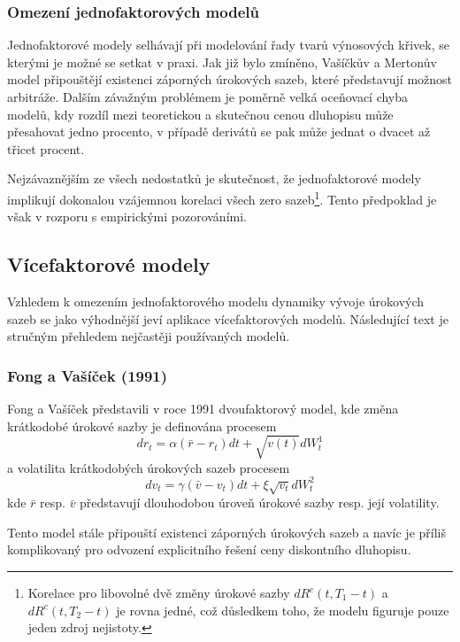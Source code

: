 \documentclass[a4paper]{book}
\begin{document}
\subsubsection{Omezení jednofaktorových modelů}

Jednofaktorové modely selhávají při modelování řady tvarů výnosových křivek, se kterými je možné se setkat v praxi. Jak již bylo zmíněno, Vašíčkův a Mertonův model připouštějí existenci záporných úrokových sazeb, které představují možnost arbitráže. Dalším závažným problémem je poměrně velká oceňovací chyba modelů, kdy rozdíl mezi teoretickou a skutečnou cenou dluhopisu může přesahovat jedno procento, v případě derivátů se pak může jednat o dvacet až třicet procent.

Nejzávaznějším ze všech nedostatků je skutečnost, že jednofaktorové modely implikují dokonalou vzájemnou korelaci všech zero sazeb\footnote{Korelace pro libovolné dvě změny úrokové sazby $dR^c(t, T_1 - t)$ a $dR^c(t, T_2 - t)$ je rovna jedné, což důsledkem toho, že modelu figuruje pouze jeden zdroj nejistoty.}. Tento předpoklad je však v rozporu s empirickými pozorováními.

\subsection{Vícefaktorové modely}

Vzhledem k omezením jednofaktorového modelu dynamiky vývoje úrokových sazeb se jako výhodnější jeví aplikace vícefaktorových modelů. Následující text je stručným přehledem nejčastěji používaných modelů.

\subsubsection{Fong a Vašíček (1991)}

Fong a Vašíček představili v roce 1991 dvoufaktorový model, kde změna krátkodobé úrokové sazby je definována procesem
\begin{equation*}
d r_t = \alpha (\bar{r} - r_t)dt + \sqrt{v(t)} dW^1_t
\end{equation*}
a volatilita krátkodobých úrokových sazeb procesem
\begin{equation*}
d v_t = \gamma (\bar{v} - v_t)dt + \xi \sqrt{v_t}dW^2_t
\end{equation*}
kde $\bar{r}$ resp. $\bar{v}$ představují dlouhodobou úroveň úrokové sazby resp. její volatility.

Tento model stále připouští existenci záporných úrokových sazeb a navíc je příliš komplikovaný pro odvození explicitního řešení ceny diskontního dluhopisu.
\end{document}

